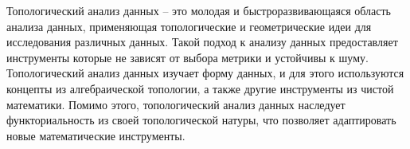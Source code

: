 Топологический анализ данных -- это молодая и быстроразвивающаяся область анализа данных, применяющая топологические и геометрические идеи для исследования различных данных. Такой подход к анализу данных предоставляет инструменты которые не зависят от выбора метрики и устойчивы к шуму.
\newline
Топологический анализ данных изучает форму данных, и для этого используются концепты из алгебраической топологии, а также другие инструменты из чистой математики. Помимо этого, топологический анализ данных наследует функториальность из своей топологической натуры, что позволяет адаптировать новые математические инструменты.